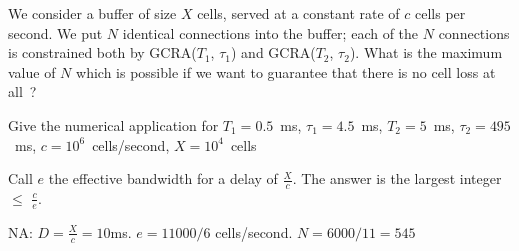 \begin{problem}
We consider a buffer of size $X$ cells, served at
a constant
        rate of $c$ cells per second.  We put $N$ identical connections into
        the buffer; each of the $N$ connections is constrained both by
        GCRA($T_{1}$, $\tau_{1}$) and GCRA($T_{2}$, $\tau_{2}$).  What is
        the maximum value of $N$ which is possible if we want to guarantee
        that there is no cell loss at all~?

        Give the numerical application for $T_{1}=0.5$~ms, $\tau_{1}=4.5$~ms,
        $T_{2}=5$~ms, $\tau_{2}=495$~ms, $c=10^6$~cells/second, $X=10^4$~cells
        \ifsol

        Call $e$ the effective bandwidth for a delay of $\frac{X}{c}$. The
        answer is the largest integer $\leq$ $\frac{c}{e}$.

        NA: $D=  \frac{X}{c} =10$ms. $e=11000/6$ cells/second. $N=6000/11 = 545$
        \fi
\end{problem}%
